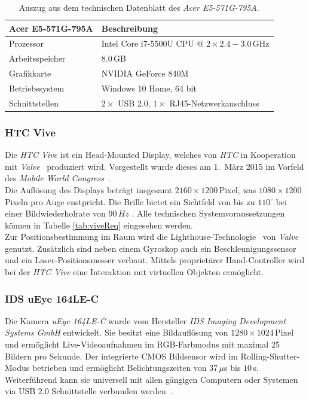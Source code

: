 \begin{table}
	\centering
	\begin{tabular}{|l|l|}
		\hline
		\Absatzbox{}
		\textbf{Acer E5-571G-795A}& \textbf{Beschreibung} \\
		\hline
		Prozessor & Intel Core i7-5500U CPU @ $2\times 2.4-3.0\,$GHz\\
		\hline
		Arbeitsspeicher & $8.0\,$GB \\
		\hline 
		Grafikkarte & NVIDIA GeForce 840M\\
		\hline
		Betriebssystem & Windows 10 Home, 64 bit \\
		\hline
		Schnittstellen & $2\times$ USB 2.0, $1\times$ RJ45-Netzwerkanschluss\\
		\hline
	\end{tabular}
	\caption[Technische Daten des \textit{Acer E5-571G-795A}]{Auszug aus dem technischen Datenblatt des \textit{Acer E5-571G-795A}.}
	\label{tab:TrackingCompParam}
\end{table}


\subsubsection{HTC Vive}\label{sec:Vive} 
Die \textit{HTC Vive} ist ein Head-Mounted Display, welches von \textit{HTC} in Kooperation mit \textit{Valve}~\cite{website:Valve} produziert wird. Vorgestellt wurde dieses am 1.\ März 2015 im Vorfeld des \textit{Mobile World Congress}~\cite{website:mobileworldcongress}.\\
Die Auflösung des Displays beträgt insgesamt $2160\times1200$\,Pixel, was $1080\times1200$\,Pixeln pro Auge enstpricht. Die Brille bietet ein Sichtfeld von bis zu $110^\circ$ bei einer Bildwiederholrate von $90\,Hz$ \cite{website:HTC_Vive}. Alle technischen Systemvoraussetzungen können in Tabelle \ref{tab:viveReq} eingesehen werden. \\
Zur Positionsbestimmung im Raum wird die Lighthouse-Technologie~\cite{website:Lighthouses} von \textit{Valve} genutzt. Zusätzlich sind neben einem Gyroskop auch ein Beschleunigungssensor und ein Laser-Positionsmesser verbaut. Mittels proprietärer Hand-Controller wird bei der \emph{HTC Vive} eine Interaktion mit virtuellen Objekten ermöglicht.

\subsubsection{IDS uEye 164LE-C}\label{sec:uEye}%
Die Kamera \textit{uEye 164LE-C} wurde vom Hersteller \textit{IDS Imaging Development Systems GmbH} entwickelt. Sie besitzt eine Bildauflösung von $1280\times1024$\,Pixel und ermöglicht Live-Videoaufnahmen im RGB-Farbmodus mit maximal $25$ Bildern pro Sekunde. Der integrierte CMOS Bildsensor wird im Rolling-Shutter-Modus betrieben und ermöglicht Belichtungszeiten von $37\,\mu$s bis $10$\,s. Weiterführend kann sie universell mit allen gängigen Computern oder Systemen via USB 2.0 Schnittstelle verbunden werden~\cite{website:UEyeTechSpec}.

